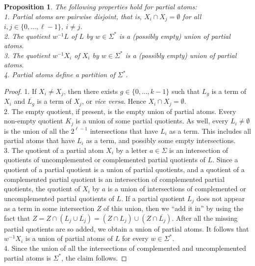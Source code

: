 \documentclass[preprint,12pt]{elsarticle}
\newcommand{\ol}{\overline}
\newcommand{\emp}{\emptyset}
\newcommand{\Sig}{\Sigma}
\newtheorem{proposition}{Proposition}
\begin{document}
\begin{proposition}
\label{prop:quotient_partial}
The following properties hold for partial atoms:\\
1. Partial atoms are pairwise disjoint, that is, $X_i\cap X_j=\emp$ for all 
$i,j\in\{0,\ldots,\ell-1\}$, $i\neq j$.\\
2. The quotient $w^{-1}L$ of $L$ by $w\in\Sig^*$ is a (possibly empty) union of 
partial atoms.\\
3. The quotient $w^{-1}X_i$ of $X_i$ by $w\in \Sig^*$ is 
a (possibly empty) union of partial atoms.\\
4. Partial atoms define a partition of $\Sig^*$.
\end{proposition}
\begin{proof}
1. If $X_i\neq X_j$, then there exists $g\in\{0,\ldots,k-1\}$ such that 
$L_g$ is a term of $X_i$ and $\ol{L_g}$ is a term of $X_j$, or \emph{vice versa}. 
Hence $X_i\cap X_j=\emp$.\\
2. The empty quotient, if present, is the empty union of partial atoms. 
Every non-empty quotient $K_j$ is a union of some partial quotients. 
As well, every $L_i\neq\emp$ is the union of all the $2^{\ell-1}$ 
intersections that have $L_i$ as a term. 
This includes all partial atoms that have $L_i$ as a term, and possibly 
some empty intersections.\\
3. The quotient of a partial atom $X_i$ by a letter $a\in\Sig$ is an intersection 
of quotients of uncomplemented or complemented partial quotients of $L$. 
Since a quotient of a partial quotient is a union of partial quotients, 
and a quotient of a complemented partial quotient is an intersection of complemented 
partial quotients, the quotient of $X_i$ by $a$ is a union of intersections of
complemented or uncomplemented partial quotients of $L$.
If a partial quotient $L_j$ does not appear as a term in some intersection $Z$ 
of this union, then we ``add it in'' by using the fact that 
$Z=Z\cap(L_j\cup \ol{L_j})=(Z\cap L_j) \cup (Z\cap \ol{L_j})$.
After all the missing partial quotients are so added, we obtain a union of 
partial atoms.
It  follows that $w^{-1}X_i$ is a union of partial atoms of $L$ for every $w\in\Sig^*$.\\
4. Since the union of all the intersections of complemented and uncomplemented partial atoms is $\Sig^*$, the claim follows.
\end{proof}
\end{document}
